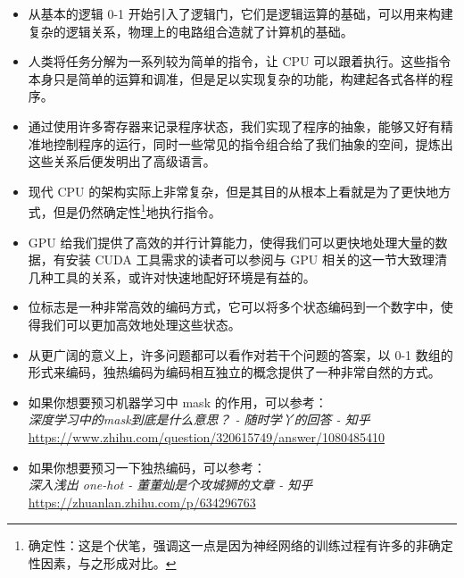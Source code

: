 \begin{itemize}
    \item 从基本的逻辑 0-1 开始引入了逻辑门，它们是逻辑运算的基础，可以用来构建复杂的逻辑关系，物理上的电路组合造就了计算机的基础。
    \item 人类将任务分解为一系列较为简单的指令，让 CPU 可以跟着执行。这些指令本身只是简单的运算和调准，但是足以实现复杂的功能，构建起各式各样的程序。
    \item 通过使用许多寄存器来记录程序状态，我们实现了程序的抽象，能够又好有精准地控制程序的运行，同时一些常见的指令组合给了我们抽象的空间，提炼出这些关系后便发明出了高级语言。
    \item 现代 CPU 的架构实际上非常复杂，但是其目的从根本上看就是为了更快地方式，但是仍然确定性\footnote{确定性：这是个伏笔，强调这一点是因为神经网络的训练过程有许多的非确定性因素，与之形成对比。}地执行指令。
    \item GPU 给我们提供了高效的并行计算能力，使得我们可以更快地处理大量的数据，有安装 CUDA 工具需求的读者可以参阅与 GPU 相关的这一节大致理清几种工具的关系，或许对快速地配好环境是有益的。
    \item 位标志是一种非常高效的编码方式，它可以将多个状态编码到一个数字中，使得我们可以更加高效地处理这些状态。
    \item 从更广阔的意义上，许多问题都可以看作对若干个问题的答案，以 0-1 数组的形式来编码，独热编码为编码相互独立的概念提供了一种非常自然的方式。
\end{itemize}


\begin{tcolorbox}[myrecommendbox, title=推荐阅读, breakable=false]
    \begin{itemize}
        \item 如果你想要预习机器学习中 mask 的作用，可以参考：\\
              \textit{深度学习中的mask到底是什么意思？ - 随时学丫的回答 - 知乎}\\
              \url{https://www.zhihu.com/question/320615749/answer/1080485410}
        \item 如果你想要预习一下独热编码，可以参考：\\
              \textit{深入浅出 one-hot - 董董灿是个攻城狮的文章 - 知乎}\\
              \url{https://zhuanlan.zhihu.com/p/634296763}
    \end{itemize}
\end{tcolorbox}